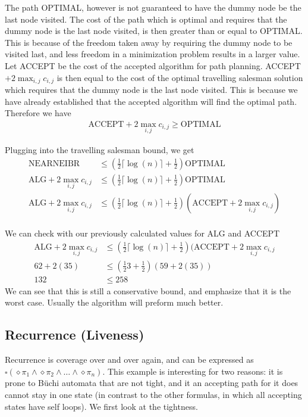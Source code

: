 The path OPTIMAL, however is not guaranteed to have the dummy node be the last node visited. The cost of the path which is optimal and requires that the dummy node is the last node visited, is then greater than or equal to OPTIMAL. This is because of the freedom taken away by requiring the dummy node to be visited last, and less freedom in a minimization problem results in a larger value. Let ACCEPT be the cost of the accepted algorithm for path planning. ACCEPT $+ 2\max_{i,j} c_{i,j}$ is then equal to the cost of the optimal travelling salesman solution which requires that the dummy node is the last node visited. This is because we have already established that the accepted algorithm will find the optimal path. Therefore we have
\begin{align*}
\text{ACCEPT} + 2\max_{i,j} c_{i,j} \geq \text{OPTIMAL}
\end{align*}

Plugging into the travelling salesman bound, we get
\begin{align*}
\text{NEARNEIBR} &\leq (\frac{1}{2} \lceil \log(n) \rceil + \frac{1}{2}) \text{OPTIMAL} \\
\text{ALG} + 2\max_{i,j} c_{i,j} &\leq (\frac{1}{2} \lceil \log(n) \rceil + \frac{1}{2}) \text{OPTIMAL} \\
\text{ALG} + 2\max_{i,j} c_{i,j} &\leq (\frac{1}{2} \lceil \log(n) \rceil + \frac{1}{2}) (\text{ACCEPT} + 2 \max_{i,j} c_{i,j}) \\ 
\end{align*} 


We can check with our previously calculated values for ALG and ACCEPT
\begin{align*}
\text{ALG} + 2\max_{i,j} c_{i,j} &\leq (\frac{1}{2} \lceil \log(n) \rceil + \frac{1}{2}) (\text{ACCEPT} + 2 \max_{i,j} c_{i,j} \\ 
62 + 2 (35) &\leq (\frac{1}{2} 3 + \frac{1}{2})(59+2(35)) \\
132 &\leq 258
\end{align*}
We can see that this is still a conservative bound, and emphasize that it is the worst case. Usually the algorithm will preform much better.


\subsection{Recurrence (Liveness)}
Recurrence is coverage over and over again, and can be expressed as $\square(\diamond \pi_1 \land \diamond \pi_2 \land \dots \land \diamond \pi_n)$. This example is interesting for two reasons: it is prone to B\"{u}chi automata that are not tight, and it an accepting path for it does cannot stay in one state (in contrast to the other formulas, in which all accepting states have self loops). We first look at the tightness.

